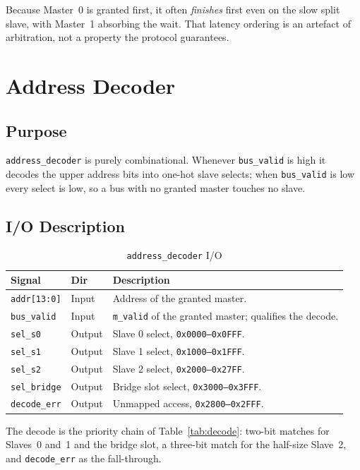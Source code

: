 \documentclass[11pt,a4paper]{article}
\newcommand{\sig}[1]{\texttt{#1}}
\begin{document}
Because Master~0 is granted first, it often \emph{finishes} first even on the
slow split slave, with Master~1 absorbing the wait. That latency ordering is an
artefact of arbitration, not a property the protocol guarantees.

\section{Address Decoder}

\subsection{Purpose}

\sig{address\_decoder} is purely combinational. Whenever \sig{bus\_valid} is
high it decodes the upper address bits into one-hot slave selects; when
\sig{bus\_valid} is low every select is low, so a bus with no granted master
touches no slave.

\subsection{I/O Description}

\begin{table}[htbp]
\centering
\caption{\sig{address\_decoder} I/O}
\label{tab:io_dec}
\small
\begin{tabularx}{\textwidth}{llX}
\toprule
\textbf{Signal} & \textbf{Dir} & \textbf{Description} \\
\midrule
\sig{addr[13:0]}  & Input  & Address of the granted master. \\
\sig{bus\_valid}  & Input  & \sig{m\_valid} of the granted master; qualifies the decode. \\
\sig{sel\_s0}     & Output & Slave 0 select, \texttt{0x0000--0x0FFF}. \\
\sig{sel\_s1}     & Output & Slave 1 select, \texttt{0x1000--0x1FFF}. \\
\sig{sel\_s2}     & Output & Slave 2 select, \texttt{0x2000--0x27FF}. \\
\sig{sel\_bridge} & Output & Bridge slot select, \texttt{0x3000--0x3FFF}. \\
\sig{decode\_err} & Output & Unmapped access, \texttt{0x2800--0x2FFF}. \\
\bottomrule
\end{tabularx}
\end{table}

The decode is the priority chain of Table~\ref{tab:decode}: two-bit matches for
Slaves~0 and~1 and the bridge slot, a three-bit match for the half-size
Slave~2, and \sig{decode\_err} as the fall-through.
\end{document}
